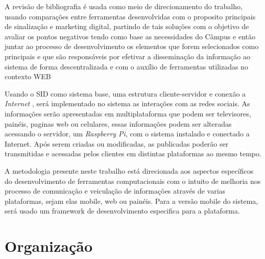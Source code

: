 A revisão de bibliografia é usada como meio de direcionamento do trabalho, usando comparações entre ferramentas desenvolvidas com o proposito principais de sinalização e marketing digital, partindo de tais soluções com o objetivo de avaliar os pontos negativos tendo como base as necessidades do Câmpus e então juntar ao processo de desenvolvimento os elementos que forem selecionados como principais e que são responsáveis por efetivar a disseminação da informação ao sistema de forma descentralizada e com o auxílio de ferramentas utilizadas no contexto WEB
	 
Usando o SID como sistema base, uma estrutura cliente-servidor e conexão a \textit{Internet} , será implementado no sistema as interações com as redes sociais. As informações serão apresentadas em multiplataforma que podem ser televisores, painéis, paginas web ou celulares, essas informações podem ser alteradas acessando o servidor, um \textit{Raspberry Pi}, com o sistema instalado e conectado a Internet. Após serem criadas ou modificadas, as publicadas poderão ser transmitidas e acessadas pelos clientes em distintas plataformas ao mesmo tempo.
	
A metodologia presente neste trabalho está direcionada aos aspectos específicos	do desenvolvimento de ferramentas computacionais com o intuito de melhoria nos processo de comunicação e veiculação de informações através de varias plataformas, sejam elas mobile, web ou painéis. Para a versão mobile do sistema, será usado um framework de desenvolvimento especifica para a plataforma.
	

\section{Organização}
